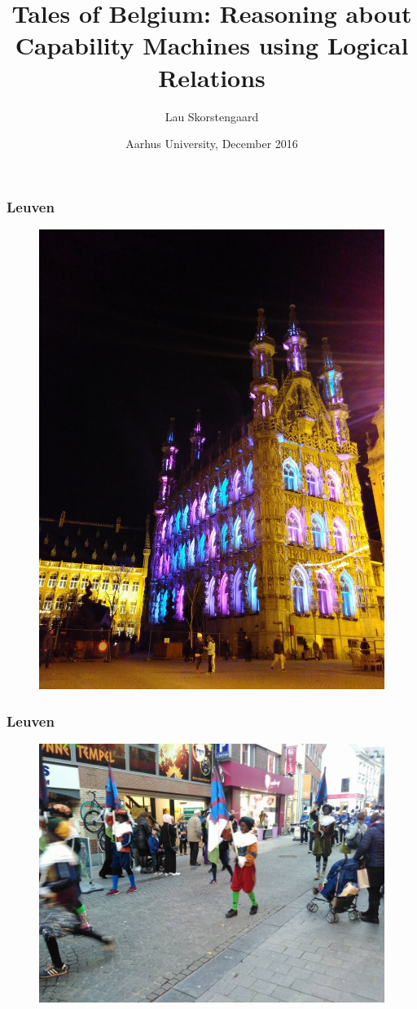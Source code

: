 \documentclass{beamer}
\title{Tales of Belgium: Reasoning about Capability Machines using Logical Relations}
\author{Lau Skorstengaard}
\institute{Aarhus University}
\date{Aarhus University, December 2016}
\begin{document}
\frame{\titlepage}


\begin{frame}
  \frametitle{Leuven}
  \begin{figure}
    \centering
    \includegraphics[scale=0.15]{leu1}
\end{figure}
\end{frame}
\begin{frame}
  \frametitle{Leuven}
  \begin{figure}
    \centering
    \includegraphics[scale=0.3]{leu2}
\end{figure}
\end{frame}
\end{document}
